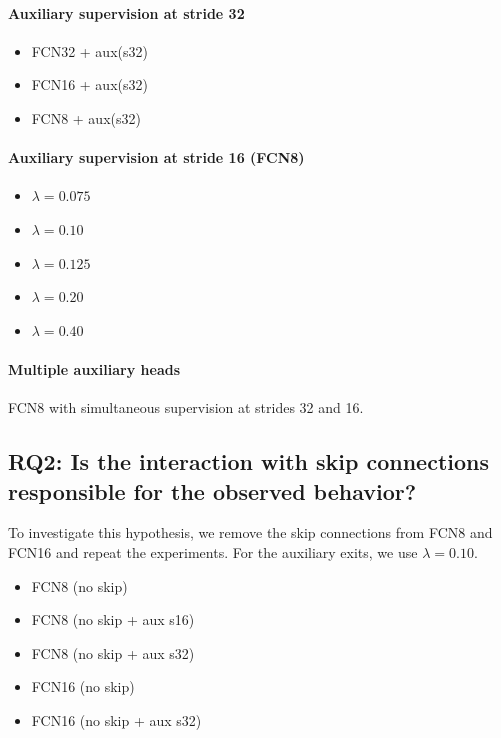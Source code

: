 \documentclass{article}
\begin{document}
    \paragraph{Auxiliary supervision at stride 32}
    \begin{itemize}
        \item FCN32 + aux(s32)
        \item FCN16 + aux(s32)
        \item FCN8 + aux(s32)
    \end{itemize}

    \paragraph{Auxiliary supervision at stride 16 (FCN8)}
    \begin{itemize}
        \item $\lambda=0.075$
        \item $\lambda=0.10$
        \item $\lambda=0.125$
        \item $\lambda=0.20$
        \item $\lambda=0.40$
    \end{itemize}

    \paragraph{Multiple auxiliary heads} \hfill\newline
    FCN8 with simultaneous supervision at strides 32 and 16.

    \subsection{RQ2: Is the interaction with skip connections responsible for the observed behavior?}

    To investigate this hypothesis, we remove the skip connections from FCN8 and FCN16
    and repeat the experiments. For the auxiliary exits, we use $\lambda=0.10$.
    \begin{itemize}
        \item FCN8 (no skip)
        \item FCN8 (no skip + aux s16)
        \item FCN8 (no skip + aux s32)
        \item FCN16 (no skip)
        \item FCN16 (no skip + aux s32)
    \end{itemize}
\end{document}
